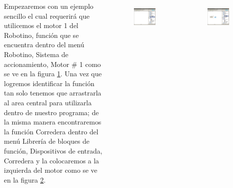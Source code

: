 \begin{frame}
	\begin{columns}
		Empezaremos con un ejemplo sencillo el cual requerirá que utilicemos el motor 1 del Robotino, función que se encuentra dentro del menú Robotino, Sistema de accionamiento, Motor \# 1 como se ve en la figura \ref{fig:inicio-02}. Una vez que logremos identificar la función tan solo tenemos que arrastrarla al area central para utilizarla dentro de nuestro programa; de la misma manera encontraremos la función Corredera dentro del menú Librería de bloques de función, Dispositivos de entrada, Corredera y la colocaremos a la izquierda del motor como se ve en la figura \ref{fig:inicio-04}.

		\begin{figure}
			\begin{center}
				\includegraphics[width=0.9\textwidth]{images/00-inicio/02.png}
				\label{fig:inicio-02}
			\end{center}
		\end{figure}

		\begin{figure}
			\begin{center}
				\includegraphics[width=0.9\textwidth]{images/00-inicio/04.png}
				\label{fig:inicio-04}
			\end{center}
		\end{figure}
	\end{columns}
\end{frame}

